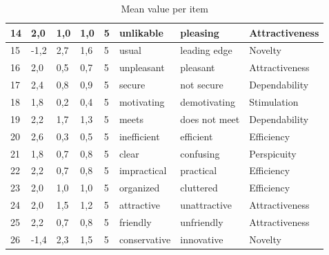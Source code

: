 \documentclass[conference,onecolumn]{IEEEtran}
\begin{document}
\begin{table}[H]
\begin{center}
\begin{tabular}[H]{ |m{1cm}|m{1cm}|m{1.2cm}|m{1.2cm}|m{1cm}|m{2cm}|m{3cm}|m{2cm}|}
                14	&2,0	&1,0	&1,0	&5	&unlikable	            &pleasing	                &Attractiveness     \\ \hline
                15	&-1,2	&2,7	&1,6	&5	&usual	                &leading edge	            &Novelty        \\ \hline
                16	&2,0	&0,5	&0,7	&5	&unpleasant	            &pleasant	                &Attractiveness     \\ \hline
                17	&2,4	&0,8	&0,9	&5	&secure	                &not secure	                &Dependability      \\ \hline
                18	&1,8	&0,2	&0,4	&5	&motivating	            &demotivating	            &Stimulation        \\ \hline
                19	&2,2	&1,7	&1,3	&5	&meets			        &does not meet				&Dependability      \\ \hline
                20	&2,6	&0,3	&0,5	&5	&inefficient	        &efficient	                &Efficiency     \\ \hline
                21	&1,8	&0,7	&0,8	&5	&clear	                &confusing	                &Perspicuity        \\ \hline
                22	&2,2	&0,7	&0,8	&5	&impractical	        &practical	                &Efficiency     \\ \hline
                23	&2,0	&1,0	&1,0	&5	&organized	            &cluttered	                &Efficiency     \\ \hline
                24	&2,0	&1,5	&1,2	&5	&attractive	            &unattractive	            &Attractiveness     \\ \hline
                25	&2,2	&0,7	&0,8	&5	&friendly	            &unfriendly	                &Attractiveness     \\ \hline
                26	&-1,4	&2,3	&1,5	&5	&conservative	        &innovative	                &Novelty        \\ 
                \hline
            \end{tabular}
        \end{center}
        \caption{Mean value per item}
        \label{table:Mean value per item}
    \end{table}


\newpage


\end{document}
